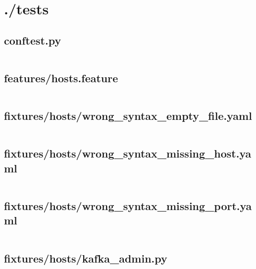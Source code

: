 \documentclass[10pt , a4paper]{report}
\newenvironment{code}{\captionsetup{type=listing}}{}
\begin{document}
\newpage
\section{./tests}
\subsection{conftest.py}
\begin{code}
  \inputminted[fontsize=\small]{Python}{../tests/conftest.py}
\end{code}

\subsection{features/hosts.feature}
\begin{code}
  \inputminted[fontsize=\small]{Gherkin}{../tests/features/hosts.feature}
\end{code}

\subsection{fixtures/hosts/wrong\_syntax\_empty\_file.yaml}
\begin{code}
  \inputminted[fontsize=\small]{YAML}{../tests/fixtures/hosts/wrong_syntax_empty_file.yaml}
\end{code}

\subsection{fixtures/hosts/wrong\_syntax\_missing\_host.yaml}
\begin{code}
  \inputminted[fontsize=\small]{YAML}{../tests/fixtures/hosts/wrong_syntax_missing_host}
\end{code}

\subsection{fixtures/hosts/wrong\_syntax\_missing\_port.yaml}
\begin{code}
  \inputminted[fontsize=\small]{YAML}{../tests/fixtures/hosts/wrong_syntax_missing_port}
\end{code}

\subsection{fixtures/hosts/kafka\_admin.py}
\begin{code}
  \inputminted[fontsize=\small]{Python}{../tests/fixtures/kafka_admin.py}
\end{code}
\end{document}
